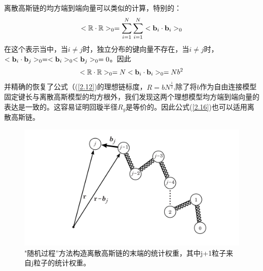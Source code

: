 离散高斯链的均方端到端向量可以类似的计算，特别的：
\begin{equation}\label{2.31}
<\mathbb{R}\cdot\mathbb{R}>_{0}=\sum_{i=1}^{N}\sum_{i=1}^{N}<\mathbf{b}_{i}\cdot\mathbf{b}_{i}>_{0}
\end{equation}
在这个表示当中，当$i\neq j$时，独立分布的键向量不存在，当$i\neq j$时，$<\mathbf{b}_{i}\cdot\mathbf{b}_{j}>_{0}=<\mathbf{b}_{i}>_{0}<\mathbf{b}_{j}>_{0}=0$。因此
\begin{equation}\label{2.32}
<\mathbb{R}\cdot\mathbb{R}>_{0}=N<\mathbf{b}_{i}\cdot\mathbf{b}_{i}>_{0}=Nb^2
\end{equation}
并精确的恢复了公式（(\ref{2.12})的理想链标度，$R=bN^\frac{1}{2}$,除了将$b$作为自由连接模型固定键长与离散高斯模型的均方根外，我们发现这两个理想模型均方端到端向量的表达是一致的。这容易证明回璇半径$R_{g}$是等价的。因此公式(\ref{2.16})也可以适用离散高斯链。
\begin{figure}[H]
\centering
\includegraphics[width=15cm]{Contents/chapter2/figures/23.png}
\caption{"随机过程”方法构造离散高斯链的末端的统计权重，其中j+1粒子来自j粒子的统计权重。}
\label{figures23}
\end{figure}


